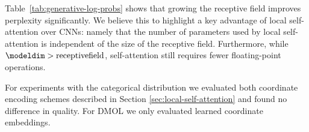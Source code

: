 Table~\ref{tab:generative-log-probs} shows that growing the receptive field improves perplexity significantly. We believe this to highlight a key advantage of local self-attention over CNNs: namely that the number of parameters used by local self-attention is independent of the size of the receptive field. Furthermore, while $\modeldim > \mathrm{receptive field}$, self-attention still requires fewer floating-point operations.

For experiments with the categorical distribution we evaluated both coordinate encoding schemes described in Section \ref{sec:local-self-attention} and found no difference in quality. For DMOL we only evaluated learned coordinate embeddings.






%
%

